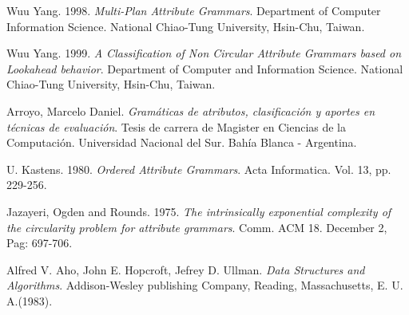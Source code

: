 \documentclass[runningheads,a4paper]{llncs}
\begin{document}

\begin{thebibliography}{10}
\vspace{-0.2cm}
 Wuu Yang. 1998. \textit{Multi-Plan Attribute Grammars}. Department of Computer Information Science. National Chiao-Tung University, Hsin-Chu, Taiwan.

 Wuu Yang. 1999. \textit{A Classification of Non Circular Attribute Grammars based on Lookahead behavior}. Department of Computer and Information Science. National Chiao-Tung University, Hsin-Chu, Taiwan.






 Arroyo, Marcelo Daniel. \textit{Gramáticas de atributos, clasificación y aportes en técnicas de evaluación}. Tesis de carrera de Magister en Ciencias de la Computación. Universidad Nacional del Sur. Bahía Blanca - Argentina.

 U. Kastens. 1980. \textit{Ordered Attribute Grammars}. Acta Informatica. Vol. 13, pp. 229-256.

 Jazayeri, Ogden and Rounds. 1975. \emph{The intrinsically exponential complexity of the circularity problem for attribute grammars}. Comm. ACM 18. December 2, Pag: 697-706.


  Alfred V. Aho, John E. Hopcroft, Jefrey D. Ullman. \textit{Data Structures and Algorithms}. Addison-Wesley publishing Company, Reading, Massachusetts, E. U. A.(1983).


\end{thebibliography}
\end{document}
